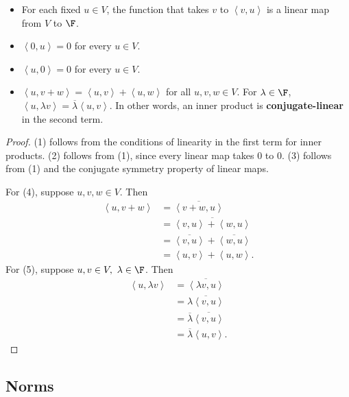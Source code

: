 \documentclass[math0540-lecture-notes.tex]{subfiles}
\begin{document}
\begin{proposition}{}
  \begin{itemize}
    \item For each fixed $u\in V$, the function that takes $v$ to $\left<v,u \right>$ is a linear
      map from $V$ to $\F$.
    \item $\left<0,u \right>=0$ for every $u\in V$.
    \item $\left<u,0 \right> = 0$ for every $u\in V$.
    \item $\left<u,v+w \right> = \left<u,v \right>+\left<u,w \right>$ for all $u,v,w\in V$. For
      $\lambda\in \F$, $\left<u,\lambda v \right>=\overline{\lambda}\left<u,v \right>$. In other
      words, an inner product is \textbf{conjugate-linear} in the second term.
  \end{itemize}
\end{proposition}
\begin{proof}[Proof]
  (1) follows from the conditions of linearity in the first term for inner products. (2) follows
  from (1), since every linear map takes $0$ to $0$. (3) follows from (1) and the conjugate symmetry
  property of linear maps.

  For (4), suppose $u,v,w\in V$. Then
  \begin{align*}
    \left<u,v+w \right> &= \overline{\left<v+w,u \right>} \\
                        &= \overline{\left<v,u \right>+\left<w,u \right>} \\
                        &= \overline{\left<v,u \right>}+\overline{\left<w,u \right>} \\
                        &=\left<u,v \right>+\left<u,w \right>
                      .\end{align*} For (5), suppose $u,v\in V,\ \lambda\in \F$. Then
  \begin{align*}
    \left<u,\lambda v \right> &= \overline{\left<\lambda v,u \right>} \\ 
    &= \overline{\lambda\left<v,u \right>} \\
    &= \overline{\lambda} \overline{\left<v,u \right>}\\
    &=\overline{\lambda}\left<u,v \right>
  .\end{align*}
\end{proof}

\subsection{Norms}
\end{document}
